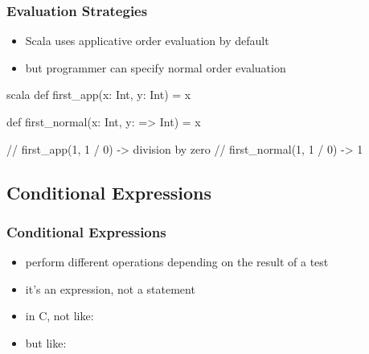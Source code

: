 \documentclass[dvipsnames]{beamer}
\theoremstyle{plain}
\begin{document}
\begin{frame}[fragile]
  \frametitle{Evaluation Strategies}

  \begin{itemize}
    \item Scala uses applicative order evaluation by default
    \item but programmer can specify normal order evaluation
  \end{itemize}

  \begin{example}[Scala]
    \begin{pygments}{scala}
def first_app(x: Int, y: Int) = x

def first_normal(x: Int, y: => Int) = x

// first_app(1, 1 / 0) -> division by zero
// first_normal(1, 1 / 0) -> 1
    \end{pygments}
  \end{example}
\end{frame}

\subsection{Conditional Expressions}

\begin{frame}
  \frametitle{Conditional Expressions}

  \begin{itemize}
    \item perform different operations depending on the result of a test

    \pause
    \bigskip
    \item it's an expression, not a statement
    \item in C, not like:\\
    \item but like:\\
  \end{itemize}
\end{frame}
\end{document}
